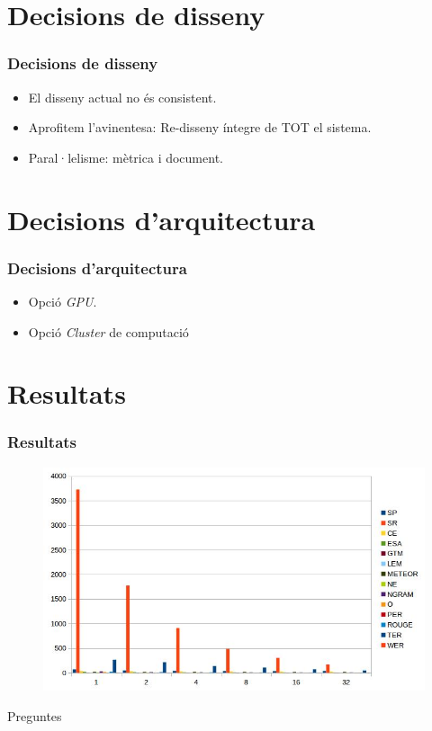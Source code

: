 \documentclass{beamer}
\begin{document}
\section{Decisions de disseny}
\begin{frame}
\frametitle{Decisions de disseny}
\begin{itemize}
\item El disseny actual no és consistent. %

\item Aprofitem l'avinentesa: Re-disseny íntegre de TOT el sistema.

\item Paral·lelisme: mètrica i document.

\end{itemize}
\end{frame}


\section{Decisions d'arquitectura}
\begin{frame}
\frametitle{Decisions d'arquitectura}
\begin{itemize}
\item Opció \textit{GPU}.

\item Opció \textit{Cluster} de computació

\end{itemize}
\end{frame}


\section{Resultats}
\begin{frame}
\frametitle{Resultats}
\begin{figure}
\includegraphics[width=\linewidth]{resources/chart_presentation.jpg}
\end{figure}
\end{frame}



\begin{frame}
\huge{\centerline{Preguntes}}
\end{frame}

\end{document}
